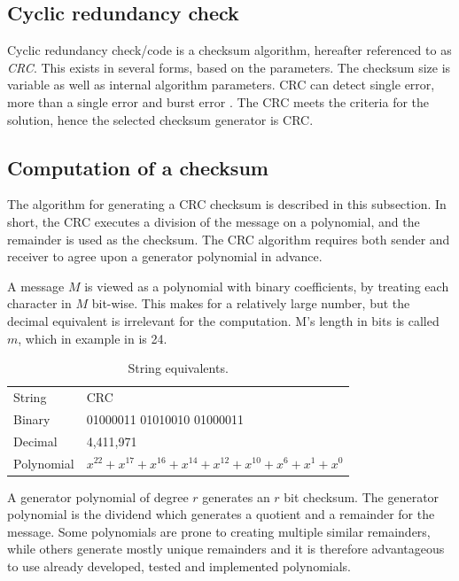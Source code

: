 \subsection*{Cyclic redundancy check}
Cyclic redundancy check/code is a checksum algorithm, hereafter referenced to as \textit{CRC}. This exists in several forms, based on the parameters. The checksum size is variable as well as internal algorithm parameters.  CRC can detect single error, more than a single error and burst error \cite[p.~31]{elahi2001network}. The CRC meets the criteria for the solution, hence the selected checksum generator is CRC.

\subsection{Computation of a checksum}\label{cha:crcComp}
The algorithm for generating a CRC checksum is described in this subsection.
In short, the CRC executes a division of the message on a polynomial, and the remainder is used as the checksum. 
The CRC algorithm requires both sender and receiver to agree upon a generator polynomial in advance.

A message $M$ is viewed as a polynomial with binary coefficients, by treating each character in $M$ bit-wise. This makes for a relatively large number, but the decimal equivalent is irrelevant for the computation. M's length in bits is called $m$, which in example in  is 24.

\begin{table}[h!]
	\centering
	\begin{tabular}{ll}
		String  & CRC                        \\
		Binary  & 01000011 01010010 01000011 \\
		Decimal & 4,411,971                  \\
		Polynomial & $x^{22} + x^{17} + x^{16} + x^{14} + x^{12} + x^{10} + x^{6} + x^{1} + x^{0}$
	\end{tabular}
	\caption{String equivalents.}
	\label{tab:string}
\end{table}

A generator polynomial of degree $r$ generates an $r$ bit checksum. The generator polynomial is the dividend which generates a quotient and a remainder for the message. Some polynomials are prone to creating multiple similar remainders, while others generate mostly unique remainders and it is therefore advantageous to use already developed, tested and implemented polynomials.

